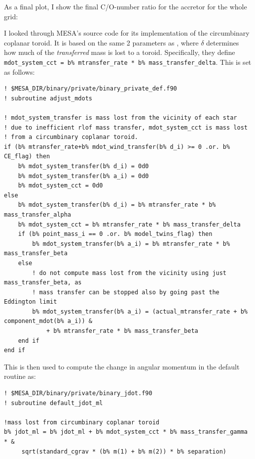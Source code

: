 \documentclass[a4paper,10pt]{article}
\begin{document}
As a final plot, I show the final C/O-number ratio for the accretor for the whole grid:

\begin{figure}[ht]
    \centering
\end{figure}



I looked through MESA's source code for its implementation of the circumbinary coplanar toroid. It is based on the same 2 parameters as \citet{soberman1997}, where \(\delta \) determines how much of the \emph{transferred} mass is lost to a toroid. Specifically, they define \lstinline[style=output, breaklines=true]|mdot_system_cct = b% mtransfer_rate * b% mass_transfer_delta|. This is set as follows:
\begin{verbatim}
! $MESA_DIR/binary/private/binary_private_def.f90
! subroutine adjust_mdots

! mdot_system_transfer is mass lost from the vicinity of each star
! due to inefficient rlof mass transfer, mdot_system_cct is mass lost
! from a circumbinary coplanar toroid.
if (b% mtransfer_rate+b% mdot_wind_transfer(b% d_i) >= 0 .or. b% CE_flag) then
    b% mdot_system_transfer(b% d_i) = 0d0
    b% mdot_system_transfer(b% a_i) = 0d0
    b% mdot_system_cct = 0d0
else 
    b% mdot_system_transfer(b% d_i) = b% mtransfer_rate * b% mass_transfer_alpha
    b% mdot_system_cct = b% mtransfer_rate * b% mass_transfer_delta
    if (b% point_mass_i == 0 .or. b% model_twins_flag) then
        b% mdot_system_transfer(b% a_i) = b% mtransfer_rate * b% mass_transfer_beta
    else
        ! do not compute mass lost from the vicinity using just mass_transfer_beta, as
        ! mass transfer can be stopped also by going past the Eddington limit
        b% mdot_system_transfer(b% a_i) = (actual_mtransfer_rate + b% component_mdot(b% a_i)) &
            + b% mtransfer_rate * b% mass_transfer_beta
    end if
end if
\end{verbatim}
This is then used to compute the change in angular momentum in the default routine as:
\begin{verbatim}
! $MESA_DIR/binary/private/binary_jdot.f90
! subroutine default_jdot_ml

!mass lost from circumbinary coplanar toroid
b% jdot_ml = b% jdot_ml + b% mdot_system_cct * b% mass_transfer_gamma * &
     sqrt(standard_cgrav * (b% m(1) + b% m(2)) * b% separation)
\end{verbatim}
\end{document}
